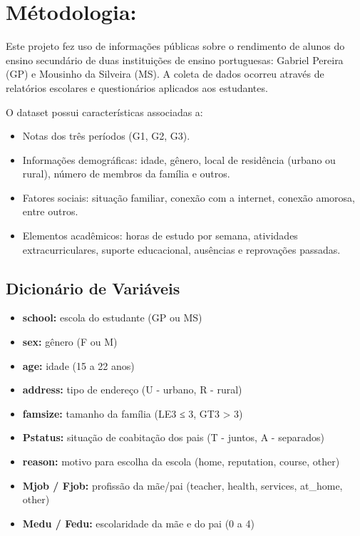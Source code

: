 \documentclass[
  letterpaper,
  DIV=11,
  numbers=noendperiod,
  openany]{scrreprt}
\providecommand{\tightlist}{%
  \setlength{\itemsep}{0pt}\setlength{\parskip}{0pt}}
\begin{document}

\chapter{Métodologia:}\label{muxe9todologia}

Este projeto fez uso de informações públicas sobre o rendimento de
alunos do ensino secundário de duas instituições de ensino portuguesas:
Gabriel Pereira (GP) e Mousinho da Silveira (MS). A coleta de dados
ocorreu através de relatórios escolares e questionários aplicados aos
estudantes.

O dataset possui características associadas a:

\begin{itemize}
\tightlist
\item
  Notas dos três períodos (G1, G2, G3).
\item
  Informações demográficas: idade, gênero, local de residência (urbano
  ou rural), número de membros da família e outros.
\item
  Fatores sociais: situação familiar, conexão com a internet, conexão
  amorosa, entre outros.
\item
  Elementos acadêmicos: horas de estudo por semana, atividades
  extracurriculares, suporte educacional, ausências e reprovações
  passadas.
\end{itemize}

\section{Dicionário de Variáveis}\label{dicionuxe1rio-de-variuxe1veis}

\begin{itemize}
\tightlist
\item
  \textbf{school:} escola do estudante (GP ou MS)
\item
  \textbf{sex:} gênero (F ou M)
\item
  \textbf{age:} idade (15 a 22 anos)
\item
  \textbf{address:} tipo de endereço (U - urbano, R - rural)
\item
  \textbf{famsize:} tamanho da família (LE3 ≤ 3, GT3 \textgreater{} 3)
\item
  \textbf{Pstatus:} situação de coabitação dos pais (T - juntos, A -
  separados)
\item
  \textbf{reason:} motivo para escolha da escola (home, reputation,
  course, other)
\item
  \textbf{Mjob / Fjob:} profissão da mãe/pai (teacher, health, services,
  at\_home, other)
\item
  \textbf{Medu / Fedu:} escolaridade da mãe e do pai (0 a 4)
\end{itemize}
\end{document}
